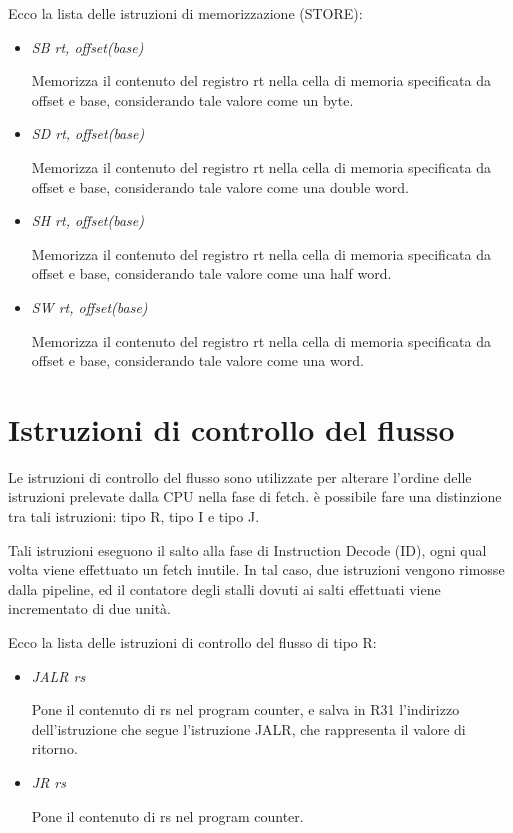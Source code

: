 \documentclass[letterpaper,10pt,english]{sphinxmanual}
\begin{document}
Ecco la lista delle istruzioni di memorizzazione (STORE):
\begin{itemize}
\item {} 
\emph{SB rt, offset(base)}

Memorizza il contenuto del registro rt nella cella di memoria specificata da
offset e base, considerando tale valore come un byte.

\item {} 
\emph{SD rt, offset(base)}

Memorizza il contenuto del registro rt nella cella di memoria specificata da
offset e base, considerando tale valore come una double word.

\item {} 
\emph{SH rt, offset(base)}

Memorizza il contenuto del registro rt nella cella di memoria specificata da
offset e base, considerando tale valore come una half word.

\item {} 
\emph{SW rt, offset(base)}

Memorizza il contenuto del registro rt nella cella di memoria specificata da
offset e base, considerando tale valore come una word.

\end{itemize}


\section{Istruzioni di controllo del flusso}
\label{instructions:istruzioni-di-controllo-del-flusso}
Le istruzioni di controllo del flusso sono utilizzate per alterare l'ordine
delle istruzioni prelevate dalla CPU nella fase di fetch. è possibile fare una
distinzione tra tali istruzioni: tipo R, tipo I e tipo J.

Tali istruzioni eseguono il salto alla fase di Instruction Decode (ID), ogni
qual volta viene effettuato un fetch inutile. In tal caso, due istruzioni
vengono rimosse dalla pipeline, ed il contatore degli stalli dovuti ai salti
effettuati viene incrementato di due unità.

Ecco la lista delle istruzioni di controllo del flusso di tipo R:
\begin{itemize}
\item {} 
\emph{JALR rs}

Pone il contenuto di rs nel program counter, e salva in R31 l'indirizzo
dell'istruzione che segue l'istruzione JALR, che rappresenta il valore di
ritorno.

\item {} 
\emph{JR rs}

Pone il contenuto di rs nel program counter.

\end{itemize}
\end{document}
